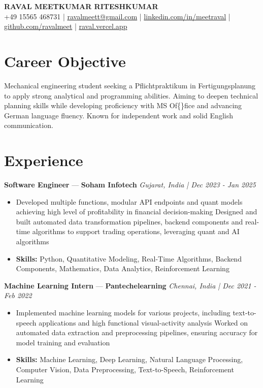 \documentclass[a4paper,10pt]{article}
\begin{document}
\begin{center}
  {\Large\bfseries RAVAL MEETKUMAR RITESHKUMAR}\\[2pt]
  {\small +49 15565 468731 \;|\; \href{mailto:ravalmeett@gmail.com}{ravalmeett@gmail.com} \;|\; \href{https://www.linkedin.com/in/meetraval/}{linkedin.com/in/meetraval} \;|\; \href{https://github.com/ravalmeet}{github.com/ravalmeet} \;|\; \href{https://raval.vercel.app/}{raval.vercel.app}}
\end{center}
\vspace{-3pt}

\section*{Career Objective}
Mechanical engineering student seeking a Pflichtpraktikum in Fertigungsplanung to apply strong analytical and programming abilities. Aiming to deepen technical planning skills while developing proficiency with MS Of\{\}fice and advancing German language fluency. Known for independent work and solid English communication.\par

\section*{Experience}
\textbf{Software Engineer} — \textbf{Soham Infotech} \hfill \textit{Gujarat, India \;|\; Dec 2023 - Jan 2025}\par
\vspace{1pt}
\begin{itemize}
  \item Developed multiple functions, modular API endpoints and quant models achieving high level of profitability in financial decision-making Designed and built automated data transformation pipelines, backend components and real-time algorithms to support trading operations, leveraging quant and AI algorithms
  \item \textbf{Skills:} Python, Quantitative Modeling, Real-Time Algorithms, Backend Components, Mathematics, Data Analytics, Reinforcement Learning
\end{itemize}
\vspace{3pt}
\textbf{Machine Learning Intern} — \textbf{Pantechelearning} \hfill \textit{Chennai, India \;|\; Dec 2021 - Feb 2022}\par
\vspace{1pt}
\begin{itemize}
  \item Implemented machine learning models for various projects, including text-to-speech applications and high functional visual-activity analysis Worked on automated data extraction and preprocessing pipelines, ensuring accuracy for model training and evaluation
  \item \textbf{Skills:} Machine Learning, Deep Learning, Natural Language Processing, Computer Vision, Data Preprocessing, Text-to-Speech, Reinforcement Learning
\end{itemize}
\end{document}
